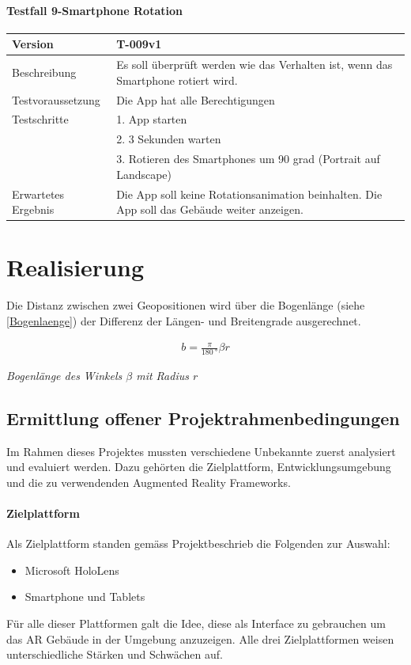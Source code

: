 \documentclass[a4paper]{scrreprt}
\newcommand{\myequations}[1]{
	\addcontentsline{equ}{myequations}{\protect\numberline{\theequation}#1}
}
\newcommand{\indexequation}[3]{
	\begin{align} \label{#3} \ensuremath{\boxed{#1}} \end{align}
	\myequations{#3} \centering \small \textit{#2} \normalsize \justify }
\begin{document}
\subsubsection{Testfall 9-Smartphone Rotation}
\begin{tabularx}{\textwidth}{|l|X|}
\hline 
	Version &
	T-009v1 \\ 
\hline 
	Beschreibung & 
	Es soll überprüft werden wie das Verhalten ist, wenn das Smartphone rotiert wird. \\ 
\hline 
	Testvoraussetzung &
	Die App hat alle Berechtigungen \\ 
\hline 
	Testschritte & 
		1. App starten \\ &
		2. 3 Sekunden warten \\ &
		3. Rotieren des Smartphones um 90 grad (Portrait auf Landscape) \\
\hline
	Erwartetes Ergebnis &
	Die App soll keine Rotationsanimation beinhalten. Die App soll das Gebäude weiter anzeigen. \\ 
\hline 
\end{tabularx}

\chapter{Realisierung}

Die Distanz zwischen zwei Geopositionen wird über die Bogenlänge (siehe \ref{Bogenlaenge}) der Differenz der Längen- und Breitengrade ausgerechnet.

\indexequation{b = \frac{\pi}{\SI{180}{\degree}}\beta r}{Bogenlänge des Winkels $\beta$ mit Radius $r$}{Bogenlaenge}

\section{Ermittlung offener Projektrahmenbedingungen}
\label{sec:evaluation}
Im Rahmen dieses Projektes mussten verschiedene Unbekannte zuerst analysiert und evaluiert werden. Dazu gehörten die Zielplattform, Entwicklungsumgebung und die zu verwendenden Augmented Reality Frameworks.
\subsubsection{Zielplattform}
Als Zielplattform standen gemäss Projektbeschrieb die Folgenden zur Auswahl:
\begin{itemize}
\item Microsoft HoloLens
\item Smartphone und Tablets
\end{itemize}
Für alle dieser Plattformen galt die Idee, diese als Interface zu gebrauchen um das AR Gebäude in der Umgebung anzuzeigen. Alle drei Zielplattformen weisen unterschiedliche Stärken und Schwächen auf.
\end{document}
